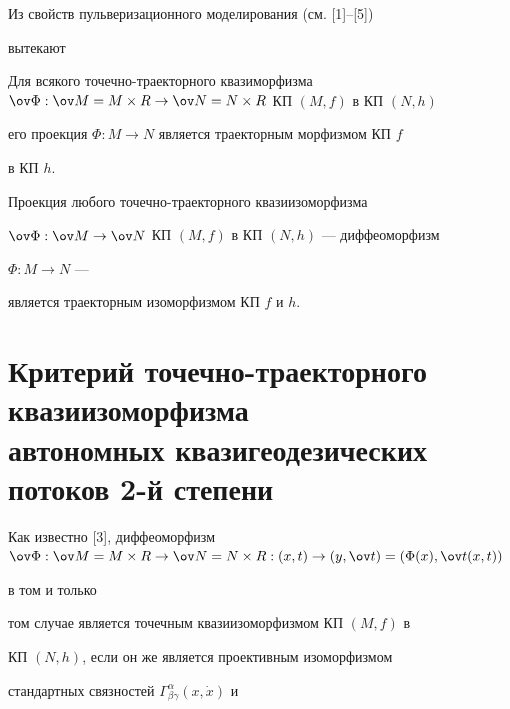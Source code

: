  


Из свойств пульверизационного моделирования (см. [1]--[5]) 


вытекают 


 


\begin{prop} 


Для всякого точечно-траекторного квазиморфизма $\ov\Phi:\ov M=M\times 


R\to\ov N=N\times R$ КП $(M,f)$ в КП $(N,h)$ 


его проекция $\Phi:M\to N$ является траекторным морфизмом КП $f$ 


в КП $h$. 


\end{prop} 


 


\begin{prop} 


Проекция любого точечно-траекторного квазиизоморфизма 


$\ov\Phi:\ov M\to\ov N$ КП $(M,f)$ в КП $(N,h)$ --- диффеоморфизм 


$\Phi:M\to N$ --- 


является траекторным изоморфизмом КП $f$ и $h$. 


\end{prop} 


 


\section{Критерий точечно-траекторного квазиизоморфизма\protect\\ 


автономных квазигеодезических потоков 2-й степени} 


 


Как известно [3], диффеоморфизм $\ov\Phi:\ov M=M\times R\to\ov 


N=N\times R:(x,t)\to(y,\ov t)=(\Phi(x),\ov t(x,t))$ 


в том и только 


том случае является точечным квазиизоморфизмом КП $(M,f)$ в 


КП $(N,h)$, если он же является проективным изоморфизмом 


стандартных связностей $\Gamma^\alpha_{\beta\gamma}(x,\Dot x)$ и 


